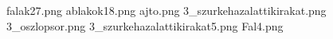falak27.png
ablakok18.png
ajto.png
3_szurkehazalattikirakat.png
3_oszlopsor.png
3_szurkehazalattikirakat5.png
Fal4.png
